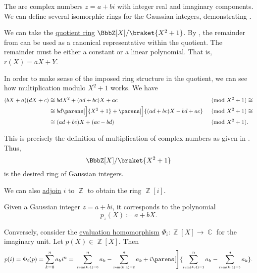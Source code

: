 \begin{example}\label{ex:gaussian_integers}
  The  are complex numbers \( z = a + bi \) with integer real and imaginary components. We can define several isomorphic rings for the Gaussian integers, demonstrating .

  \begin{thmenum}
     We can take the \hyperref[def:ring/quotient]{quotient ring} \( \BbbZ[X] / \braket{X^2 + 1} \). By , the remainder from  can be used as a canonical representative within the quotient. The remainder must be either a constant or a linear polynomial. That is, \( r(X) = aX + Y \).

    In order to make sense of the imposed ring structure in the quotient, we can see how multiplication modulo \( X^2 + 1 \) works. We have
    \begin{align*}
      (bX + a) (dX + c)
      &\cong
      bdX^2 + (ad + bc)X + ac
      &\pmod {X^2 + 1} \cong \\ &\cong
      bd\parens[\Big]{ X^2 + 1 } + \parens[\Big]{ (ad + bc)X - bd + ac }
      &\pmod {X^2 + 1} \cong \\ &\cong
      (ad + bc)X + (ac - bd)
      &\pmod {X^2 + 1}. \phantom{\cong}
    \end{align*}

    This is precisely the definition of multiplication of complex numbers as given in . Thus,
    \begin{equation*}
      \BbbZ[X] / \braket{X^2 + 1}
    \end{equation*}
    is the desired ring of Gaussian integers.

     We can also \hyperref[thm:adjoining_elements_to_semiring]{adjoin} \( i \) to \( \BbbZ \) to obtain the ring \( \BbbZ[i] \).

    Given a Gaussian integer \( z = a + bi \), it corresponds to the polynomial
    \begin{equation*}
      p_z(X) \coloneqq a + bX.
    \end{equation*}

    Conversely, consider the \hyperref[thm:polynomial_semiring_universal_property]{evaluation homomorphism} \( \Phi_i: \BbbZ[X] \to \BbbC \) for the imaginary unit. Let \( p(X) \in \BbbZ[X] \). Then
    \begin{equation*}
      p(i)
      =
      \Phi_i(p)
      =
      \sum_{k=0}^n a_k i^n
      =
      \thickspace \sum_{\scriptscriptstyle{\rem(k, 4) = 0}}^n a_k - \sum_{\scriptscriptstyle{\rem(k, 4) = 2}}^n a_k + i \parens[\Bigg]{ \sum_{\scriptscriptstyle{\rem(k, 4) = 1}}^n a_k - \sum_{\scriptscriptstyle{\rem(k, 4) = 3}}^n a_k }.
    \end{equation*}


\end{thmenum}
\end{example}
